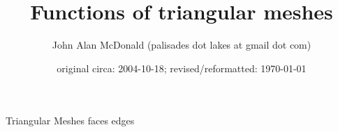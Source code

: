 \documentclass{PalisadesLakesReport}
\title{Functions of triangular meshes}
\author{John Alan McDonald (palisades dot lakes at gmail dot com)}
\date{original circa: 2004-10-18; revised/reformatted: \today}
\begin{document}
\maketitle
\PalisadesLakesTableOfContents
\def\sharedFolder{../../shared/}






\begin{plSection}{Triangular Meshes}
{faces}
{edges}

\end{plSection}%






\end{document}
